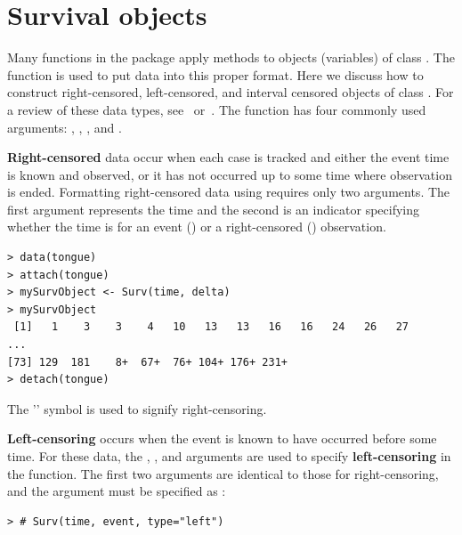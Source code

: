 \documentclass[article]{jss}
\begin{document}
\pagebreak



\section[Survival objects]{Survival objects} %
\label{survObjects}

Many functions in the  package apply methods to objects (variables) of class . The  function is used to put data into this proper format. Here we discuss how to construct right-censored, left-censored, and interval censored objects of class . For a review of these data types, see~\citet{formsOfSurvData} or~\citet{Klein2003}. The  function has four commonly used arguments: , , , and .

\textbf{Right-censored} data occur when each case is tracked and either the event time is known and observed, or it has not occurred up to some time where observation is ended. Formatting right-censored data using  requires only two arguments. The first argument represents the time and the second is an indicator specifying whether the time is for an event () or a right-censored () observation.
\begin{verbatim}
> data(tongue)
> attach(tongue)
> mySurvObject <- Surv(time, delta)
> mySurvObject
 [1]   1    3    3    4   10   13   13   16   16   24   26   27 
...
[73] 129  181    8+  67+  76+ 104+ 176+ 231+
> detach(tongue)
\end{verbatim}
The '\code{+}' symbol is used to signify right-censoring. 

\textbf{Left-censoring} occurs when the event is known to have occurred before some time. For these data, the , , and  arguments are used to specify \textbf{left-censoring} in the  function. The first two arguments are identical to those for right-censoring, and the  argument must be specified as :
\begin{verbatim}
> # Surv(time, event, type="left")
\end{verbatim}
\end{document}
